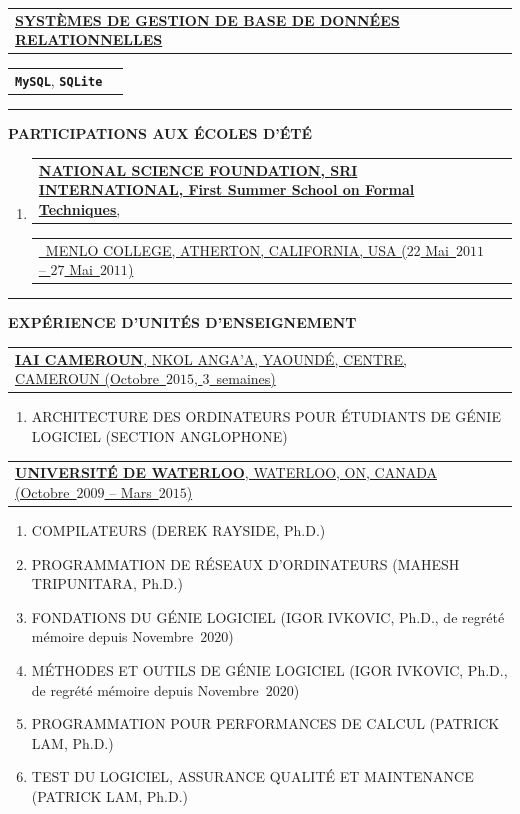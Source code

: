 \documentclass[9pt,a4paper]{article} %
\makeatletter
\newcommand{\headerrow}[2]
{\begin{tabular*}{\linewidth}{l@{\extracolsep{\fill}}r}
	#1 &
	#2 \\
\end{tabular*}}
\newcommand{\headerrowONE}[1]{\headerrow{#1}{}}
\newcommand{\mysql}{\texttt{MySQL}\xspace}
\newcommand{\sqlite}{\texttt{SQLite}\xspace}
\newcommand{\cvitemdate}[2]{#1~$#2$\xspace}
\makeatother
\begin{document}
\vspace{0.3em}

\headerrowONE{\textbf{\underline{SYSTÈMES DE GESTION DE BASE DE DONNÉES RELATIONNELLES}}}
\headerrowONE{\textbf{\mysql}, \textbf{\sqlite}}

\vspace{1em}

\hrule
\begin{center}
{\large \textbf{PARTICIPATIONS AUX ÉCOLES D'ÉTÉ}}
\end{center}

\vspace{0.5em}

\begin{enumerate}
	\item \headerrowONE{\href{http://fm.csl.sri.com/SSFT11/}{\textbf{NATIONAL SCIENCE FOUNDATION, SRI INTERNATIONAL, First Summer School on Formal Techniques},}}
			\headerrowONE{\href{http://fm.csl.sri.com/SSFT11}{\ \hfill  MENLO COLLEGE, ATHERTON, 
			CALIFORNIA, USA (\cvitemdate{$22$ Mai}{2011} -- \cvitemdate{$27$ Mai}{2011})}}

\end{enumerate}

\vspace{1em}


\hrule
\begin{center}
{\large \textbf{EXPÉRIENCE D'UNITÉS D'ENSEIGNEMENT}}
\end{center}

\vspace{0.5em}

\headerrowONE{\href{http://iaicameroun.com}{\textbf{IAI CAMEROUN}, NKOL ANGA'A, YAOUNDÉ, CENTRE, CAMEROUN (Octobre~$2015$, $3$~semaines)}}
\begin{enumerate}
	\item ARCHITECTURE DES ORDINATEURS POUR ÉTUDIANTS DE GÉNIE LOGICIEL (SECTION ANGLOPHONE)
\end{enumerate}

\vspace{0.5em}

\headerrowONE{\href{http://ece.uwaterloo.ca}{\textbf{UNIVERSITÉ DE WATERLOO}, WATERLOO, ON, CANADA (Octobre~$2009$ -- Mars~$2015$)}}

\begin{enumerate}
	\itemsep -0.3em
	\item COMPILATEURS (DEREK RAYSIDE, Ph.D.)
	\item PROGRAMMATION DE RÉSEAUX D'ORDINATEURS (MAHESH TRIPUNITARA, Ph.D.)
	\item FONDATIONS DU GÉNIE LOGICIEL (IGOR IVKOVIC, Ph.D., de regrété mémoire depuis Novembre~$2020$)
	\item MÉTHODES ET OUTILS DE GÉNIE LOGICIEL (IGOR IVKOVIC, Ph.D., de regrété mémoire depuis Novembre~$2020$)
	\item PROGRAMMATION POUR PERFORMANCES DE CALCUL (PATRICK LAM, Ph.D.)
	\item TEST DU LOGICIEL, ASSURANCE QUALITÉ ET MAINTENANCE (PATRICK LAM, Ph.D.)
\end{enumerate}
\end{document}
